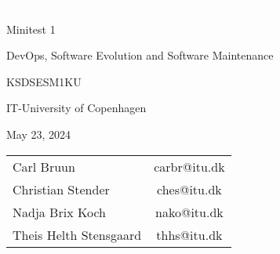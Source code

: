 \begin{center}
\thispagestyle{empty}

\textcolor{white}{.}
\vspace{1.5cm}


{\Huge
Minitest 1
}

\vspace{1.5cm}

{\Large
DevOps, Software Evolution and Software Maintenance
}

KSDSESM1KU
\vspace{1cm}

IT-University of Copenhagen

May 23, 2024

\vspace{9cm}

{\Large
\begin{tabular}{l c}
   Carl Bruun  & carbr@itu.dk \\
   Christian Stender  & ches@itu.dk \\
   Nadja Brix Koch & nako@itu.dk \\
   Theis Helth Stensgaard & thhs@itu.dk
\end{tabular}
}

\end{center}
